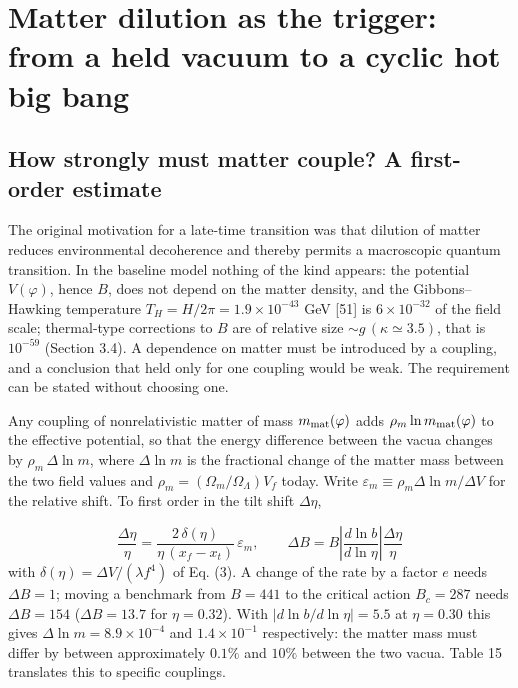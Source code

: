 \documentclass[11pt,a4paper]{article}
\begin{document}
\section{Matter dilution as the trigger: from a held vacuum to a cyclic hot big bang}
\subsection{How strongly must matter couple? A first-order estimate}
The original motivation for a late-time transition was that dilution of matter reduces environmental decoherence and thereby permits a macroscopic quantum transition. In the baseline model nothing of the kind appears: the potential $V(\varphi)$, hence $B$, does not depend on the matter density, and the Gibbons--Hawking temperature $T_H=H/2\pi=1.9\times10^{-43}$ GeV [51] is $6\times10^{-32}$ of the field scale; thermal-type corrections to $B$ are of relative size $\sim g\,(\kappa\simeq3.5)$, that is $10^{-59}$ (Section 3.4). A dependence on matter must be introduced by a coupling, and a conclusion that held only for one coupling would be weak. The requirement can be stated without choosing one.

Any coupling of nonrelativistic matter of mass $m_{\rm mat}(\varphi)$ adds $\rho_m\ln m_{\rm mat}(\varphi)$ to the effective potential, so that the energy difference between the vacua changes by $\rho_m\,\Delta\ln m$, where $\Delta\ln m$ is the fractional change of the matter mass between the two field values and $\rho_m=(\Omega_m/\Omega_\Lambda)V_f$ today. Write $\varepsilon_m\equiv\rho_m\Delta\ln m/\Delta V$ for the relative shift. To first order in the tilt shift $\Delta\eta$,

\begin{equation}
\frac{\Delta\eta}{\eta}=\frac{2\,\delta(\eta)}{\eta\,(x_f-x_t)}\,\varepsilon_m,\qquad \Delta B=B\left|\frac{d\ln b}{d\ln\eta}\right|\frac{\Delta\eta}{\eta}
\end{equation}
with $\delta(\eta)=\Delta V/(\lambda f^4)$ of Eq. (3). A change of the rate by a factor $e$ needs $\Delta B=1$; moving a benchmark from $B=441$ to the critical action $B_c=287$ needs $\Delta B=154$ ($\Delta B=13.7$ for $\eta=0.32$). With $|d\ln b/d\ln\eta|=5.5$ at $\eta=0.30$ this gives $\Delta\ln m=8.9\times10^{-4}$ and $1.4\times10^{-1}$ respectively: the matter mass must differ by between approximately $0.1\%$ and $10\%$ between the two vacua. Table 15 translates this to specific couplings.
\end{document}
